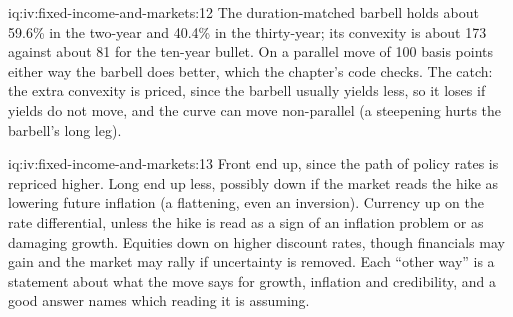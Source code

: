 \begin{solution}{iq:iv:fixed-income-and-markets:12}
The duration-matched barbell holds about 59.6\% in the two-year and 40.4\% in the thirty-year; its convexity is about 173
against about 81 for the ten-year bullet. On a parallel move of 100 basis points either way the barbell does better, which the
chapter's code checks. The catch: the extra convexity is priced, since the barbell usually yields less, so it loses if yields do
not move, and the curve can move non-parallel (a steepening hurts the barbell's long leg).
\end{solution}

\begin{solution}{iq:iv:fixed-income-and-markets:13}
Front end up, since the path of policy rates is repriced higher. Long end up less, possibly down if the market reads the hike
as lowering future inflation (a flattening, even an inversion). Currency up on the rate differential, unless the hike is read as
a sign of an inflation problem or as damaging growth. Equities down on higher discount rates, though financials may gain and
the market may rally if uncertainty is removed. Each ``other way'' is a statement about what the move says for growth, inflation
and credibility, and a good answer names which reading it is assuming.
\end{solution}
